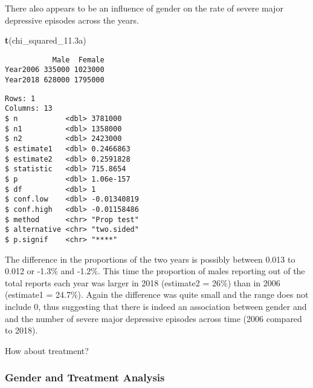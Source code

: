 \documentclass[
]{article}
\newenvironment{Shaded}{\begin{snugshade}}{\end{snugshade}}
\newcommand{\DataTypeTok}[1]{\textcolor[rgb]{0.13,0.29,0.53}{#1}}
\newcommand{\FloatTok}[1]{\textcolor[rgb]{0.00,0.00,0.81}{#1}}
\newcommand{\KeywordTok}[1]{\textcolor[rgb]{0.13,0.29,0.53}{\textbf{#1}}}
\newcommand{\NormalTok}[1]{#1}
\newcommand{\OperatorTok}[1]{\textcolor[rgb]{0.81,0.36,0.00}{\textbf{#1}}}
\newcommand{\OtherTok}[1]{\textcolor[rgb]{0.56,0.35,0.01}{#1}}
\newcommand{\StringTok}[1]{\textcolor[rgb]{0.31,0.60,0.02}{#1}}
\begin{document}
There also appears to be an influence of gender on the rate of severe
major depressive episodes across the years.

\begin{Shaded}
\begin{Highlighting}[]
\KeywordTok{t}\NormalTok{(chi_squared_}\FloatTok{11.3}\NormalTok{a) }
\end{Highlighting}
\end{Shaded}

\begin{verbatim}
           Male  Female
Year2006 335000 1023000
Year2018 628000 1795000
\end{verbatim}

\begin{Shaded}
\end{Shaded}

\begin{verbatim}
Rows: 1
Columns: 13
$ n           <dbl> 3781000
$ n1          <dbl> 1358000
$ n2          <dbl> 2423000
$ estimate1   <dbl> 0.2466863
$ estimate2   <dbl> 0.2591828
$ statistic   <dbl> 715.8654
$ p           <dbl> 1.06e-157
$ df          <dbl> 1
$ conf.low    <dbl> -0.01340819
$ conf.high   <dbl> -0.01158486
$ method      <chr> "Prop test"
$ alternative <chr> "two.sided"
$ p.signif    <chr> "****"
\end{verbatim}

The difference in the proportions of the two years is possibly between
0.013 to 0.012 or -1.3\% and -1.2\%. This time the proportion of males
reporting out of the total reports each year was larger in 2018
(estimate2 = 26\%) than in 2006 (estimate1 = 24.7\%). Again the
difference was quite small and the range does not include 0, thus
suggesting that there is indeed an association between gender and and
the number of severe major depressive episodes across time (2006
compared to 2018).

How about treatment?

\hypertarget{gender-and-treatment-analysis}{%
\subsubsection{\texorpdfstring{\textbf{Gender and Treatment
Analysis}}{Gender and Treatment Analysis}}\label{gender-and-treatment-analysis}}
\end{document}

